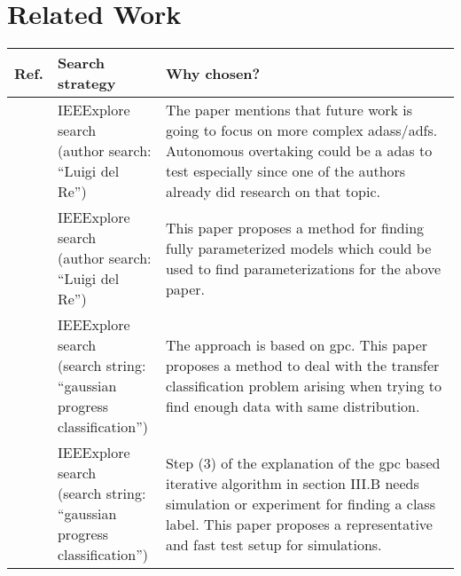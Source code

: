 \documentclass[oneside, notitlepage, twocolumn]{scrartcl}
\newcommand{\tableheadline}[1]{\textbf{#1}}
\begin{document}
\section{Related Work}
\begin{adjustbox}{angle=90}
\begin{tabularx}{\textwidth}{llX}
    \tableheadline{Ref.} & \tableheadline{Search strategy} & \tableheadline{Why chosen?}\\
    \midrule
    \cite{overtake} & \makecell{IEEExplore search\\(author search:\\``Luigi del Re'')} & The paper mentions that future work is going to focus on more complex \glspl{adas}/\glspl{adf}.
    Autonomous overtaking could be a \gls{adas} to test especially since one of the authors already did research on that topic.\\
    \midrule
    \cite{fastParam} & \makecell{IEEExplore search\\(author search:\\``Luigi del Re'')} & This paper proposes a method for finding fully parameterized models which could be used to find parameterizations for the above paper.\\
    \midrule
    \cite{gpcAdapt} & \makecell{IEEExplore search\\(search string:\\``gaussian progress\\classification'')}& The approach is based on \gls{gpc}.
        This paper proposes a method to deal with the transfer classification problem arising when trying to find enough data with same distribution.\\
    \midrule
    \cite{integrated} & \makecell{IEEExplore search\\(search string:\\``gaussian progress\\classification'')}& Step (3) of the explanation of the \gls{gpc} based iterative algorithm in section III.B needs simulation or experiment for finding a class label.
        This paper proposes a representative and fast test setup for simulations.\\
\end{tabularx}
\end{adjustbox}
\end{document}
